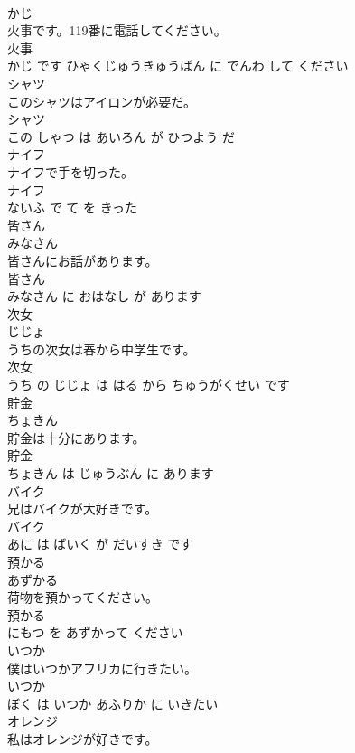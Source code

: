 \documentclass[8pt]{extreport}
\begin{document}
\begin{CJK}{UTF8}{min}
\\	かじ			
\\	火事です。119番に電話してください。	
\\	火事 
\\	かじ です ひゃくじゅうきゅうばん に でんわ して ください			
\\	シャツ	
\\	このシャツはアイロンが必要だ。	
\\	シャツ 
\\	この しゃつ は あいろん が ひつよう だ			
\\	ナイフ	
\\	ナイフで手を切った。	
\\	ナイフ 
\\	ないふ で て を きった			
\\	皆さん	
\\	みなさん			
\\	皆さんにお話があります。	
\\	皆さん 
\\	みなさん に おはなし が あります			
\\	次女	
\\	じじょ			
\\	うちの次女は春から中学生です。	
\\	次女 
\\	うち の じじょ は はる から ちゅうがくせい です			
\\	貯金	
\\	ちょきん			
\\	貯金は十分にあります。	
\\	貯金 
\\	ちょきん は じゅうぶん に あります			
\\	バイク	
\\	兄はバイクが大好きです。	
\\	バイク 
\\	あに は ばいく が だいすき です			
\\	預かる	
\\	あずかる			
\\	荷物を預かってください。	
\\	預かる 
\\	にもつ を あずかって ください			
\\	いつか	
\\	僕はいつかアフリカに行きたい。	
\\	いつか 
\\	ぼく は いつか あふりか に いきたい			
\\	オレンジ	
\\	私はオレンジが好きです。	

\end{CJK}
\end{document}
